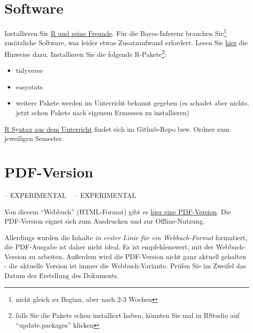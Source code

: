 \documentclass[
  a4paper,
  DIV=11]{scrreprt}
\providecommand{\tightlist}{%
  \setlength{\itemsep}{0pt}\setlength{\parskip}{0pt}}\usepackage{longtable,booktabs,array}
\theoremstyle{definition}
\theoremstyle{definition}
\theoremstyle{remark}
\begin{document}
\hypertarget{software}{%
\section*{Software}\label{software}}


Installieren Sie
\href{https://data-se.netlify.app/2021/11/30/installation-von-r-und-seiner-freunde/}{R
und seine Freunde}. Für die Bayes-Inferenz brauchen Sie\footnote{nicht
  gleich zu Beginn, aber nach 2-3 Wochen} zusätzliche Software, was
leider etwas Zusatzaufwand erfordert. Lesen Sie
\href{https://data-se.netlify.app/2022/01/28/bayes-software-installieren-f\%C3\%BCr-r/}{hier}
die Hinweise dazu. Installieren Sie die folgende R-Pakete\footnote{falls
  Sie die Pakete schon installiert haben, könnten Sie mal in RStudio auf
  ``update.packages'' klicken}:

\begin{itemize}
\tightlist
\item
  tidyverse
\item
  easystats
\item
  weitere Pakete werden im Unterricht bekannt gegeben (es schadet aber
  nichts, jetzt schon Pakete nach eigenem Ermessen zu installieren)
\end{itemize}

\href{https://github.com/sebastiansauer/Lehre}{R Syntax aus dem
Unterricht} findet sich im Github-Repo bzw. Ordner zum jeweiligen
Semester.

\hypertarget{pdf-version}{%
\section*{PDF-Version}\label{pdf-version}}


-- EXPERIMENTAL 🔬🧪 -- EXPERIMENTAL

Von diesem ``Webbuch'' (HTML-Format) gibt es
\href{_book/statistik1.pdf}{hier eine PDF-Version}. Die PDF-Version
eignet sich zum Ausdrucken und zur Offline-Nutzung.

Allerdings wurden die Inhalte \emph{in erster Linie für ein
Webbuch-Format} formatiert, die PDF-Ausgabe ist daher nicht ideal. Es
ist empfehlenswert, mit der Webbuch-Version zu arbeiten. Außerdem wird
die PDF-Version nicht ganz aktuell gehalten - die aktuelle Version ist
immer die Webbuch-Variante. Prüfen Sie im Zweifel das Datum der
Erstellung des Dokuments.
\end{document}
